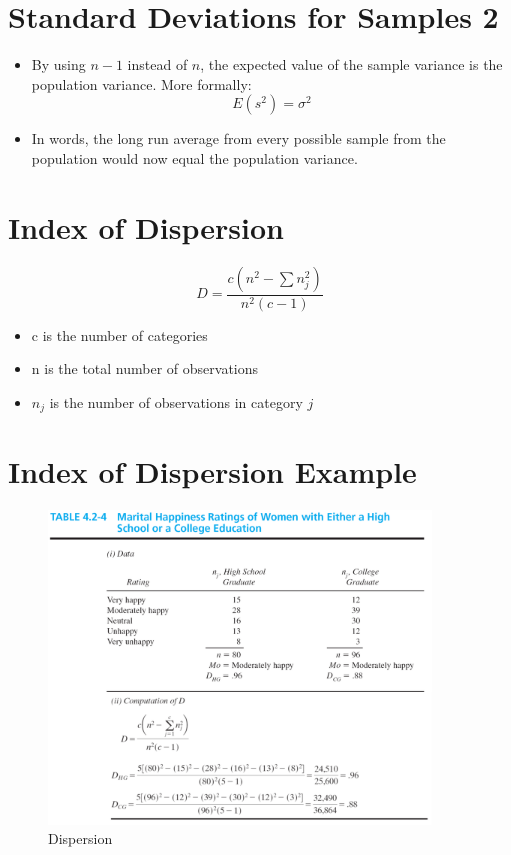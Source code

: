 \documentclass[12pt]{article}
\begin{document}
\section{Standard Deviations for Samples
2}\label{standard-deviations-for-samples-2}

\begin{itemize}
\itemsep1pt\parskip0pt
\item
  By using \(n - 1\) instead of \(n\), the expected value of the sample
  variance is the population variance. More formally:
  \[ E(s^2) = \sigma^2 \]
\item
  In words, the long run average from every possible sample from the
  population would now equal the population variance.
\end{itemize}

\section{Index of Dispersion}\label{index-of-dispersion}

\[ D = \frac{c\left( n^2 - \sum n_{j}^{2} \right)}{n^2 (c - 1)} \]

\begin{itemize}
\itemsep1pt\parskip0pt
\item
  c is the number of categories
\item
  n is the total number of observations
\item
  \(n_{j}\) is the number of observations in category \(j\)
\end{itemize}

\section{Index of Dispersion Example}\label{index-of-dispersion-example}

\begin{figure}[H]
\centering
\includegraphics[width=4in]{indexdispersion.png}
\caption{Dispersion}
\end{figure}
\end{document}
